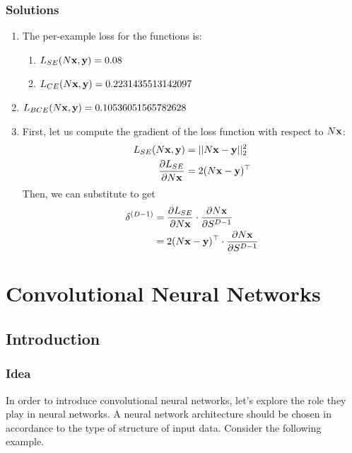 \subsection{Solutions}
\begin{enumerate}
    \item The per-example loss for the functions is:
    \begin{enumerate}
        \item $L_{SE}(N\vx, \vy) = 0.08$
        \item $L_{CE}(N\vx, \vy) = 0.2231435513142097$
    \end{enumerate}
    \item $L_{BCE}(N\vx, \vy) = 0.10536051565782628$
    \item First, let us compute the gradient of the loss function with respect to $N\vx$:
    \begin{align*}
        L_{SE}(N\vx,\vy) &= ||N\vx-\vy||_{2}^{2} \\
        \frac{\partial L_{SE}}{\partial N\vx} &= 2(N\vx-\vy)^\top
    \end{align*}
    Then, we can substitute to get
    \begin{align*}
        \delta^{(D-1)} &= \frac{\partial L_{SE}}{\partial N\vx}\cdot\frac{\partial N\vx}{\partial S^{D-1}} \\
        &= 2(N\vx-\vy)^\top\cdot\frac{\partial N\vx}{\partial S^{D-1}}
    \end{align*}
\end{enumerate}

\chapter{Convolutional Neural Networks}

\section{Introduction}

\subsection{Idea} In order to introduce convolutional neural networks, let's explore the role they play in neural networks.
A neural network architecture should be chosen in accordance to the type of structure of input data. Consider the following example.

